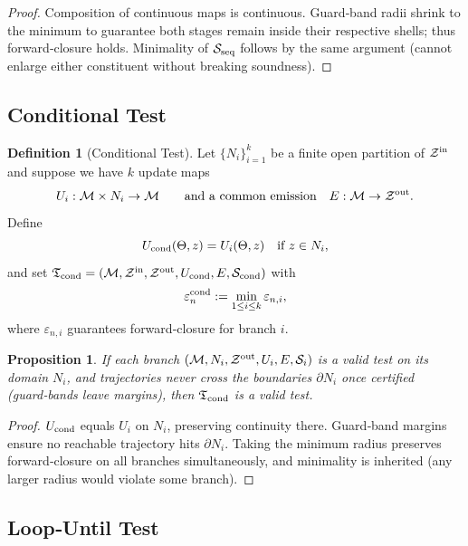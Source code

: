 \documentclass[12pt]{article}
\theoremstyle{definition}
\newtheorem{definition}{Definition}[section]
\theoremstyle{plain}
\newtheorem{proposition}{Proposition}[section]
\begin{document}
\begin{proof}
Composition of continuous maps is continuous.  Guard‑band radii shrink to the minimum to guarantee both stages remain inside their respective shells; thus forward‑closure holds.  Minimality of $\mathcal S_{\rm seq}$ follows by the same argument (cannot enlarge either constituent without breaking soundness).
\end{proof}

\subsection{Conditional Test}
\label{subsec:conditional}

\begin{definition}[Conditional Test]
Let $\{N_i\}_{i=1}^k$ be a finite open partition of $\mathcal Z^{\rm in}$ and suppose we have $k$ update maps
\[
  U_i:\mathcal M\times N_i\to\mathcal M
  \qquad\text{and a common emission}\quad E:\mathcal M\to\mathcal Z^{\rm out}.
\]
Define
\[
  U_{\rm cond}(\Theta,z)=U_i(\Theta,z)\quad\text{if }z\in N_i,
\]
and set $\mathfrak T_{\rm cond}=(\mathcal M,\mathcal Z^{\rm in},\mathcal Z^{\rm out},U_{\rm cond},E,\mathcal S_{\rm cond})$ with
\[
  \varepsilon_n^{\rm cond} := \min_{1\le i\le k}\varepsilon_{n,i},
\]
where $\varepsilon_{n,i}$ guarantees forward‑closure for branch $i$.
\end{definition}

\begin{proposition}
If each branch $(\mathcal M,N_i,\mathcal Z^{\rm out},U_i,E,\mathcal S_i)$ is a valid test on its domain $N_i$, and trajectories never cross the boundaries $\partial N_i$ once certified (guard‑bands leave margins), then $\mathfrak T_{\rm cond}$ is a valid test.
\end{proposition}

\begin{proof}
$U_{\rm cond}$ equals $U_i$ on $N_i$, preserving continuity there.  Guard‑band margins ensure no reachable trajectory hits $\partial N_i$.  Taking the minimum radius preserves forward‑closure on all branches simultaneously, and minimality is inherited (any larger radius would violate some branch).
\end{proof}

\subsection{Loop‑Until Test}
\label{subsec:loop}
\end{document}
